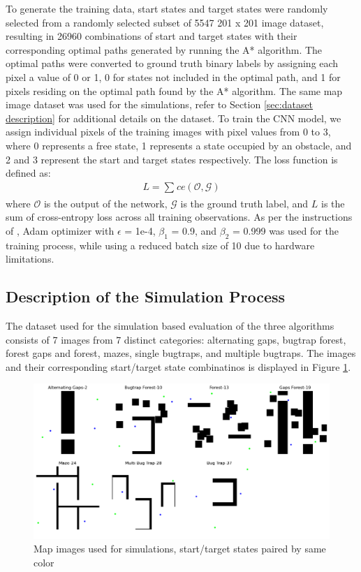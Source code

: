 \documentclass{article}
\begin{document}
To generate the training data, start states and target states were randomly selected from a randomly selected subset of 5547 201 x 201 image dataset, resulting in 26960 combinations of start and target states with their corresponding optimal paths generated by running the A* algorithm. The optimal paths were converted to ground truth binary labels by assigning each pixel a value of 0 or 1, 0 for states not included in the optimal path, and 1 for pixels residing on the optimal path found by the A* algorithm. The same map image dataset was used for the simulations, refer to Section \ref{sec:dataset description} for additional details on the dataset. To train the CNN model, we assign individual pixels of the training images with pixel values from 0 to 3, where 0 represents a free state, 1 represents a state occupied by an obstacle, and 2 and 3 represent the start and target states respectively. The loss function is defined as:
\begin{align}
    L = \sum_{}^{} ce(\mathcal{O}, \mathcal{G})
\end{align}
where $\mathcal{O}$ is the output of the network, $\mathcal{G}$ is the ground truth label, and $L$ is the sum of cross-entropy loss across all training observations. As per the instructions of \cite{nrrt}, Adam optimizer with $\epsilon$ = 1e-4, $\beta_1$ = 0.9, and $\beta_2$ = 0.999 was used for the training process, while using a reduced batch size of 10 due to hardware limitations.
    
\subsection{Description of the Simulation Process}
\label{sec:description}
The dataset \cite{dataset} used for the simulation based evaluation of the three algorithms consists of 7 images from 7 distinct categories: alternating gaps, bugtrap forest, forest gaps and forest, mazes, single bugtraps, and multiple bugtraps. The images and their corresponding start/target state combinatinos is displayed in Figure \ref{fig:data}.

\begin{figure}[H]
\includegraphics[width=\textwidth]{map_data}
\centering
\caption{Map images used for simulations, start/target states paired by same color}
\label{fig:data}
\end{figure}
\end{document}
